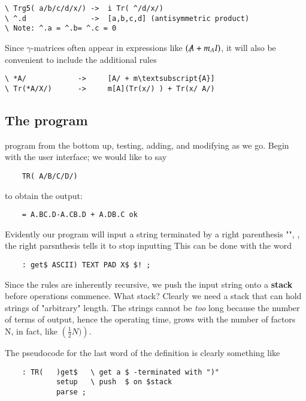 \begin{verbatim}
\ Trg5( a/b/c/d/x/) ->  i Tr( ^/d/x/)
\ ^.d               ->  [a,b,c,d] (antisymmetric product)
\ Note: ^.a = ^.b= ^.c = 0
\end{verbatim}

Since $\gamma$-matrices often appear in expressions like $(\tr{A} + m_{A}I)$, it will also be convenient to include the additional rules

\begin{Verbatim}[commandchars=\\\{\}]
\ *A/            ->     [A/ + m\textsubscript{A}]
\ Tr(*A/X/)      ->     m[A](Tr(x/) ) + Tr(x/ A/)
\end{Verbatim}

\subsection{The program}
 program from the bottom up, testing, adding, and modifying as we go. Begin with the user interface; we would like to say

\begin{lstlisting}
    TR( A/B/C/D/)
\end{lstlisting}

to obtain the output:

\begin{lstlisting}
    = A.BC.D-A.CB.D + A.DB.C ok
\end{lstlisting}

Evidently our program will input a string terminated by a right parenthesis "\bc{)}", \ie, the right parsnthesis tells it to stop inputting This can be done with the word

\begin{lstlisting}
    : get$ ASCII) TEXT PAD X$ $! ;
\end{lstlisting}

Since the rules are inherently recursive, we push the input string onto a \textbf{stack} before operations commence. What stack? Clearly we need a stack that can hold strings of "arbitrary" length. The strings cannot be \textit{too} long because the number of terms of output, hence the operating time, grows with the number of factors N, in fact, like $\left(\frac{1}{2}N)\right)$\bc{!}.

The pseudocode for the last word of the definition is clearly something like

\begin{lstlisting}
    : TR(   )get$   \ get a $ -terminated with ")"
            setup   \ push  $ on $stack
            parse ;
\end{lstlisting}

